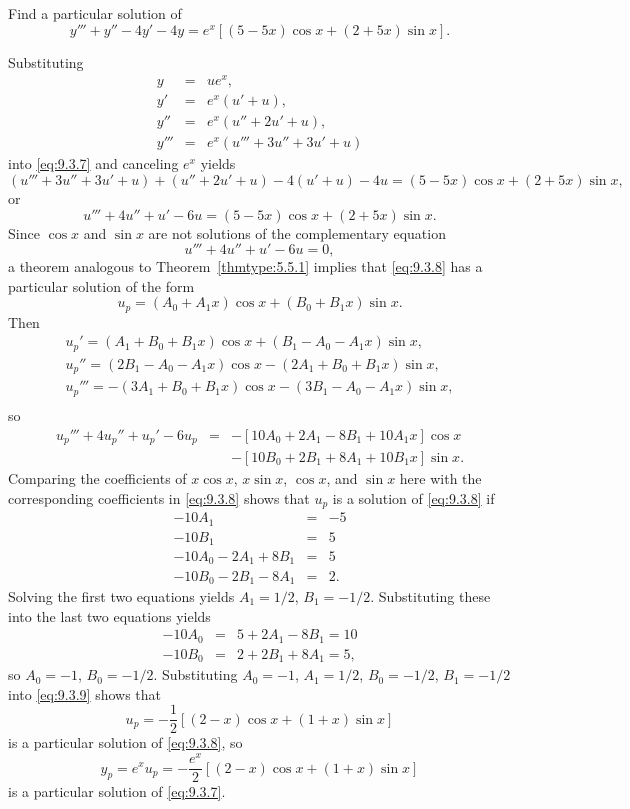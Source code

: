 \documentclass{ximera}
\begin{document}
\begin{example}\label{example:9.3.3}
Find a particular solution of
\begin{equation} \label{eq:9.3.7}
y'''+y''-4y'-4y=e^x[(5-5x)\cos x+(2+5x)\sin x].
\end{equation}


\begin{explanation}
Substituting
\begin{eqnarray*}
y&=&ue^x,\\ y'&=&e^x(u'+u),\\
y''&=&e^x(u''+2u'+u),\\
y'''&=&e^x(u'''+3u''+3u'+u)
\end{eqnarray*}
into \eqref{eq:9.3.7} and canceling $e^x$ yields
$$
(u'''+3u''+3u'+u)+(u''+2u'+u)-4(u'+u)-4u
=(5-5x)\cos x+(2+5x)\sin x,
$$
or
\begin{equation} \label{eq:9.3.8}
u'''+4u''+u'-6u=(5-5x)\cos x+(2+5x)\sin x.
\end{equation}
Since $\cos x$ and $\sin x$ are not solutions of the complementary
equation
$$
u'''+4u''+u'-6u=0,
$$
a theorem analogous to Theorem~\ref{thmtype:5.5.1} implies that
\eqref{eq:9.3.8} has a particular solution of the form
\begin{equation} \label{eq:9.3.9}
u_p=(A_0+A_1x)\cos x+(B_0+B_1x)\sin x.
\end{equation}
Then
\begin{eqnarray*}
u_p'=(A_1+B_0+B_1x)\cos x+(B_1-A_0-A_1x)\sin x,\\
 u_p''=(2B_1-A_0-A_1x)\cos x-(2A_1+B_0+B_1x)\sin x,\\
 u_p'''=-(3A_1+B_0+B_1x)\cos x-(3B_1-A_0-A_1x)\sin x,\\
\end{eqnarray*}
so
$$
\begin{array}{rcl}
u_p'''+4u_p''+u_p'-6u_p&=&-\left[10A_0+2A_1-8B_1+10A_1x\right]\cos
x\\ &&- \left[10B_0+2B_1+8A_1+10B_1x\right]\sin x.
\end{array}
$$
Comparing the coefficients of $x\cos x$, $x\sin x$, $\cos x$, and
$\sin x$ here with the corresponding coefficients in \eqref{eq:9.3.8}
shows that $u_p$ is a solution of \eqref{eq:9.3.8} if
$$
\begin{array}{rcr}
-10A_1&=&-5\\
-10B_1&=&5\\
-10A_0-2A_1+8B_1&=&5\\
-10B_0-2B_1-8A_1&=&2.
\end{array}
$$
Solving the first two equations yields $A_1=1/2$, $B_1=-1/2$.
Substituting these into the last two equations  yields
\begin{eqnarray*}
-10A_0&=&5+2A_1-8B_1=10\\
-10B_0&=&2+2B_1+8A_1=5,
 \end{eqnarray*}
so $A_0=-1$, $B_0=-1/2$.
Substituting $A_0=-1$, $A_1=1/2$, $B_0=-1/2$, $B_1=-1/2$ into
\eqref{eq:9.3.9} shows that
$$
u_p=-\frac{1}{2}\left[(2-x)\cos
x+(1+x)\sin x\right]
$$
is a particular solution of  \eqref{eq:9.3.8}, so
$$
y_p=e^xu_p=-\frac{e^x}{2}\left[(2-x)\cos x+(1+x)\sin x\right]
$$
is a particular  solution of \eqref{eq:9.3.7}.


\end{explanation}
\end{example}
\end{document}
